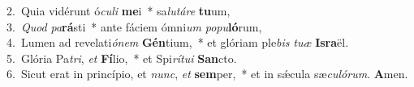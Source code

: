 {2.~}Quia vidérunt ó\textit{cu}\textit{li} \textbf{me}i~* sa\textit{lu}\textit{tá}\textit{re} \textbf{tu}um,\\
{3.~}\textit{Quod} \textit{pa}\textbf{rá}sti~* ante fáciem ómni\textit{um} \textit{po}\textit{pu}\textbf{ló}rum,\\
{4.~}Lumen ad revelati\textit{ó}\textit{nem} \textbf{Gén}tium,~* et glóriam ple\textit{bis} \textit{tu}\textit{æ} \textbf{Is}\textbf{ra}ël.\\
{5.~}Glória Pa\textit{tri}, \textit{et} \textbf{Fí}lio,~* et Spi\textit{rí}\textit{tu}\textit{i} \textbf{San}cto.\\
{6.~}Sicut erat in princípio, et \textit{nunc}, \textit{et} \textbf{sem}per,~* et in sǽcula sæ\textit{cu}\textit{ló}\textit{rum}. \textbf{A}men.\\
